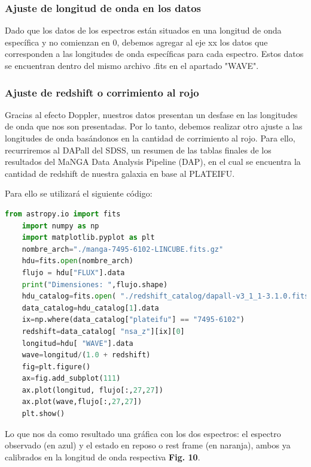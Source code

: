\documentclass[9pt,twocolumn,a4paper]{opticajnl}
\begin{document}
\subsubsection*{Ajuste de longitud de onda en los datos}

Dado que los datos de los espectros están situados en una longitud de onda específica y no comienzan en 0, debemos agregar al eje xx los datos que corresponden a las longitudes de onda específicas para cada espectro. Estos datos se encuentran dentro del mismo archivo .fits en el apartado "WAVE".

\subsubsection*{Ajuste de redshift o corrimiento al rojo}

Gracias al efecto Doppler, nuestros datos presentan un desfase en las longitudes de onda que nos son presentadas. Por lo tanto, debemos realizar otro ajuste a las longitudes de onda basándonos en la cantidad de corrimiento al rojo. Para ello, recurriremos al DAPall del SDSS, un resumen de las tablas finales de los resultados del MaNGA Data Analysis Pipeline (DAP), en el cual se encuentra la cantidad de redshift de nuestra galaxia en base al PLATEIFU.

Para ello se utilizará el siguiente código:

\begin{lstlisting}[language=Python]
    from astropy.io import fits
    import numpy as np 
    import matplotlib.pyplot as plt
    nombre_arch="./manga-7495-6102-LINCUBE.fits.gz"
    hdu=fits.open(nombre_arch)
    flujo = hdu["FLUX"].data
    print("Dimensiones: ",flujo.shape)
    hdu_catalog=fits.open( "./redshift_catalog/dapall-v3_1_1-3.1.0.fits")
    data_catalog=hdu_catalog[1].data
    ix=np.where(data_catalog["plateifu"] == "7495-6102") 
    redshift=data_catalog[ "nsa_z"][ix][0]
    longitud=hdu[ "WAVE"].data
    wave=longitud/(1.0 + redshift)
    fig=plt.figure()
    ax=fig.add_subplot(111)
    ax.plot(longitud, flujo[:,27,27]) 
    ax.plot(wave,flujo[:,27,27])
    plt.show()
\end{lstlisting}

Lo que nos da como resultado una gráfica con los dos espectros: el espectro observado (en azul) y el estado en reposo o rest frame (en naranja), ambos ya calibrados en la longitud de onda respectiva \textbf{Fig. 10}.
\end{document}
